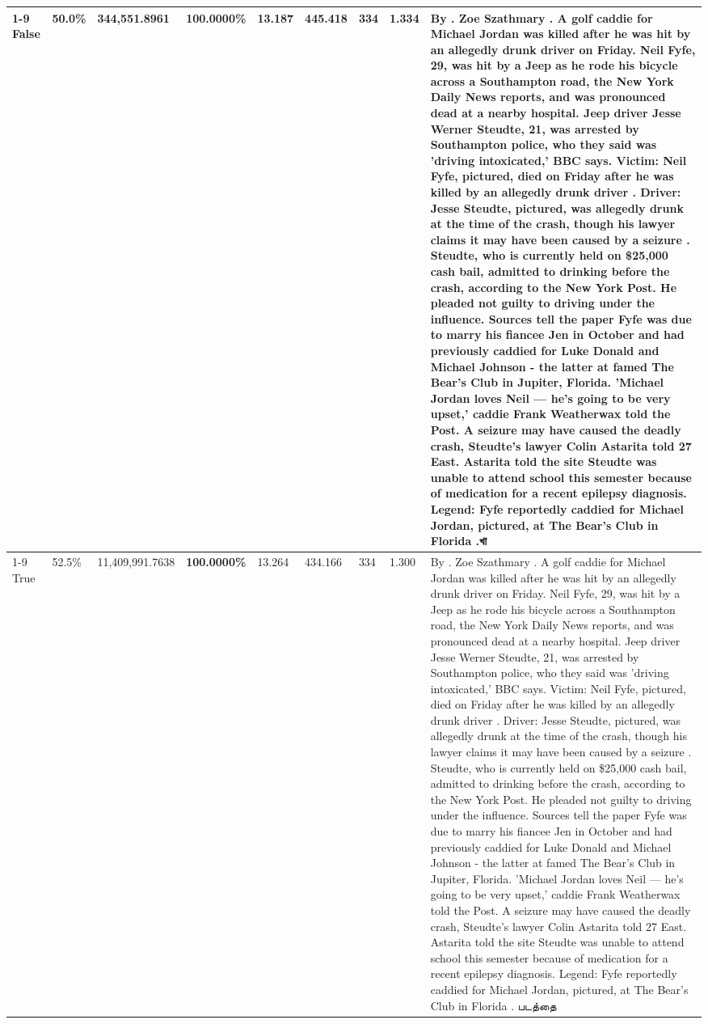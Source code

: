 \begin{table}[H]
\begin{tabular}{lllrlllll}
\cline{1-9}
False & 50.0\% & 344,551.8961 & \bfseries \color{red} 100.0000\% & 13.187 & 445.418 & 334 & 1.334 & By . Zoe Szathmary . A golf caddie for Michael Jordan was killed after he was hit by an allegedly drunk driver on Friday. Neil Fyfe, 29, was hit by a Jeep as he rode his bicycle across a Southampton road, the New York Daily News reports, and was pronounced dead at a nearby hospital. Jeep driver Jesse Werner Steudte, 21, was arrested by Southampton police, who they said was 'driving intoxicated,' BBC says. Victim: Neil Fyfe, pictured, died on Friday after he was killed by an allegedly drunk driver . Driver: Jesse Steudte, pictured, was allegedly drunk at the time of the crash, though his lawyer claims it may have been caused by a seizure . Steudte, who is currently held on \$25,000 cash bail, admitted to drinking before the crash, according to the New York Post. He pleaded not guilty to driving under the influence. Sources tell the paper Fyfe was due to marry his fiancee Jen in October and had previously caddied for Luke Donald and Michael Johnson - the latter at famed The Bear's Club in Jupiter, Florida. 'Michael Jordan loves Neil — he’s going to be very upset,' caddie Frank Weatherwax told the Post. A seizure may have caused the deadly crash, Steudte's lawyer Colin Astarita told 27 East. Astarita told the site Steudte was unable to attend school this semester because of medication for a recent epilepsy diagnosis. Legend: Fyfe reportedly caddied for Michael Jordan, pictured, at The Bear's Club in Florida .খা \\
\cline{1-9}
True & 52.5\% & 11,409,991.7638 & \bfseries \color{red} 100.0000\% & 13.264 & 434.166 & 334 & 1.300 & By . Zoe Szathmary . A golf caddie for Michael Jordan was killed after he was hit by an allegedly drunk driver on Friday. Neil Fyfe, 29, was hit by a Jeep as he rode his bicycle across a Southampton road, the New York Daily News reports, and was pronounced dead at a nearby hospital. Jeep driver Jesse Werner Steudte, 21, was arrested by Southampton police, who they said was 'driving intoxicated,' BBC says. Victim: Neil Fyfe, pictured, died on Friday after he was killed by an allegedly drunk driver . Driver: Jesse Steudte, pictured, was allegedly drunk at the time of the crash, though his lawyer claims it may have been caused by a seizure . Steudte, who is currently held on \$25,000 cash bail, admitted to drinking before the crash, according to the New York Post. He pleaded not guilty to driving under the influence. Sources tell the paper Fyfe was due to marry his fiancee Jen in October and had previously caddied for Luke Donald and Michael Johnson - the latter at famed The Bear's Club in Jupiter, Florida. 'Michael Jordan loves Neil — he’s going to be very upset,' caddie Frank Weatherwax told the Post. A seizure may have caused the deadly crash, Steudte's lawyer Colin Astarita told 27 East. Astarita told the site Steudte was unable to attend school this semester because of medication for a recent epilepsy diagnosis. Legend: Fyfe reportedly caddied for Michael Jordan, pictured, at The Bear's Club in Florida . படத்தை \\

\end{tabular}
\end{table}
